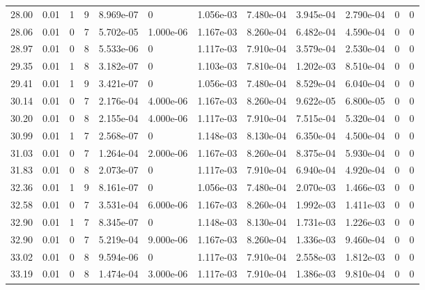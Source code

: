 \documentclass[preview]{standalone}
\begin{document}
{{{\begin{tabular}{L{1.2cm}C{1.2cm} C{0.3cm}C{0.5cm} C{1.4cm}C{1.4cm} C{1.4cm}C{1.4cm} C{1.6cm}C{1.6cm} C{1.6cm}C{1.6cm}}
  28.00  &  0.01  & 1     &  9 &  8.969e-07  & 0  &  1.056e-03&   7.480e-04& 3.945e-04 & 2.790e-04   &  0 & 0  \\ 
  28.06  &  0.01  & 0     &  7 &  5.702e-05  & 1.000e-06  &  1.167e-03&   8.260e-04& 6.482e-04 & 4.590e-04   &  0 & 0  \\ 
  28.97  &  0.01  & 0     &  8 &  5.533e-06  & 0  &  1.117e-03&   7.910e-04& 3.579e-04 & 2.530e-04   &  0 & 0  \\ 
  29.35  &  0.01  & 1     &  8 &  3.182e-07  & 0  &  1.103e-03&   7.810e-04& 1.202e-03 & 8.510e-04   &  0 & 0  \\ 
  29.41  &  0.01  & 1     &  9 &  3.421e-07  & 0  &  1.056e-03&   7.480e-04& 8.529e-04 & 6.040e-04   &  0 & 0  \\ 
  30.14  &  0.01  & 0     &  7 &  2.176e-04  & 4.000e-06  &  1.167e-03&   8.260e-04& 9.622e-05 & 6.800e-05   &  0 & 0  \\ 
  30.20  &  0.01  & 0     &  8 &  2.155e-04  & 4.000e-06  &  1.117e-03&   7.910e-04& 7.515e-04 & 5.320e-04   &  0 & 0  \\ 
  30.99  &  0.01  & 1     &  7 &  2.568e-07  & 0  &  1.148e-03&   8.130e-04& 6.350e-04 & 4.500e-04   &  0 & 0  \\ 
  31.03  &  0.01  & 0     &  7 &  1.264e-04  & 2.000e-06  &  1.167e-03&   8.260e-04& 8.375e-04 & 5.930e-04   &  0 & 0  \\ 
  31.83  &  0.01  & 0     &  8 &  2.073e-07  & 0  &  1.117e-03&   7.910e-04& 6.940e-04 & 4.920e-04   &  0 & 0  \\ 
  32.36  &  0.01  & 1     &  9 &  8.161e-07  & 0  &  1.056e-03&   7.480e-04& 2.070e-03 & 1.466e-03   &  0 & 0  \\ 
  32.58  &  0.01  & 0     &  7 &  3.531e-04  & 6.000e-06  &  1.167e-03&   8.260e-04& 1.992e-03 & 1.411e-03   &  0 & 0  \\ 
  32.90  &  0.01  & 1     &  7 &  8.345e-07  & 0  &  1.148e-03&   8.130e-04& 1.731e-03 & 1.226e-03   &  0 & 0  \\ 
  32.90  &  0.01  & 0     &  7 &  5.219e-04  & 9.000e-06  &  1.167e-03&   8.260e-04& 1.336e-03 & 9.460e-04   &  0 & 0  \\ 
  33.02  &  0.01  & 0     &  8 &  9.594e-06  & 0  &  1.117e-03&   7.910e-04& 2.558e-03 & 1.812e-03   &  0 & 0  \\ 
  33.19  &  0.01  & 0     &  8 &  1.474e-04  & 3.000e-06  &  1.117e-03&   7.910e-04& 1.386e-03 & 9.810e-04   &  0 & 0  \\ 
\hline 
\end{tabular} 

}}}
\end{document}
